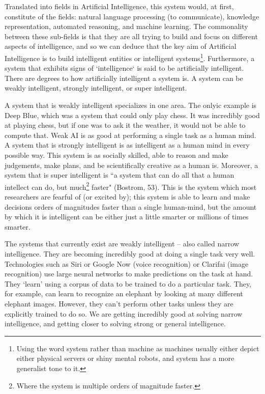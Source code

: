 \documentclass[11pt]{article}
\begin{document}
\par Translated into fields in Artificial Intelligence, this system would, at first, constitute of the fields: natural language processing (to communicate), knowledge representation, automated reasoning, and machine learning. The commonality between these sub-fields is that they are all trying to build and focus on different aspects of intelligence, and so we can deduce that the key aim of Artificial Intelligence is to build intelligent entities or intelligent systems\footnote{Using the word system rather than machine as machines usually either depict either physical servers or shiny mental robots, and system has a more generalist tone to it.}. Furthermore, a system that exhibits signs of `intelligence` is said to be artificially intelligent. There are degrees to how artificially intelligent a system is. A system can be weakly intelligent, strongly intelligent, or super intelligent. 

\par A system that is weakly intelligent specializes in one area. The onlyic example is Deep Blue, which was a system that could only play chess. It was incredibly good at playing chess, but if one was to ask it the weather, it would not be able to compute that. Weak AI is as good at performing a single task as a human mind. A system that is strongly intelligent is as intelligent as a human mind in every possible way. This system is as socially skilled, able to reason and make judgements, make plans, and be scientifically creative as a human is. Moreover, a system that is super intelligent is ``a system that can do all that a human intellect can do, but much\footnote{Where the system is multiple orders of magnitude faster.} faster" (Bostrom, 53). This is the system which most researchers are fearful of (or excited by); this system is able to learn and make decisions orders of magnitudes faster than a single human-mind, but the amount by which it is intelligent can be either just a little smarter or millions of times smarter.

\par The systems that currently exist are weakly intelligent -- also called narrow intelligence. They are becoming incredibly good at doing a single task very well. Technologies such as Siri or Google Now (voice recognition) or Clarifai (image recognition) use large neural networks to make predictions on the task at hand. They `learn' using a corpus of data to be trained to do a particular task. They, for example, can learn to recognize an elephant by looking at many different elephant images. However, they can't perform other tasks unless they are explicitly trained to do so. We are getting incredibly good at solving narrow intelligence, and getting closer to solving strong or general intelligence.
\end{document}
